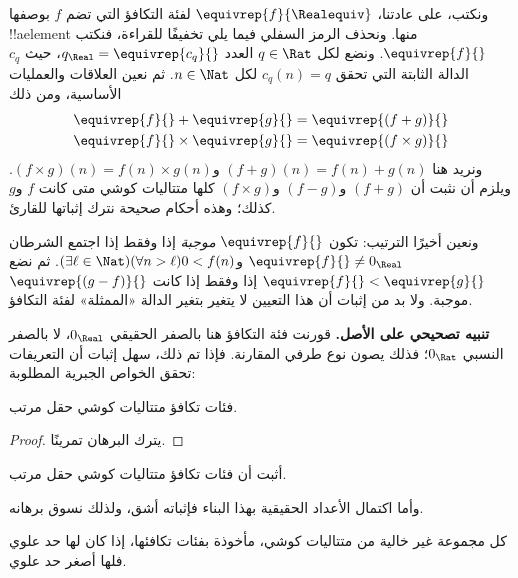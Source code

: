 \documentclass[../../../include/open-logic-section]{subfiles}
\begin{document}
ونكتب، على عادتنا، $\equivrep{f}{\Realequiv}$ لفئة التكافؤ التي تضم $f$ بوصفها !!a{element} منها. ونحذف الرمز السفلي فيما يلي تخفيفًا للقراءة، فنكتب $\equivrep{f}{}$. ونضع لكل $q \in \Rat$ العدد $q_{\Real} = \equivrep{c_{q}}{}$، حيث $c_{q}$ الدالة الثابتة التي تحقق $c_q(n) = q$ لكل $n \in \Nat$. ثم نعين العلاقات والعمليات الأساسية، ومن ذلك
\begin{align*}
	\equivrep{f}{} + \equivrep{g}{} &= 	\equivrep{(f + g)}{} \\
	\equivrep{f}{} \times 	\equivrep{g}{} &= \equivrep{(f \times g)}{} 
\end{align*}
ونريد هنا $(f + g)(n) = f(n) + g(n)$ و$(f \times g)(n) = f(n) \times
g(n)$. ويلزم أن نثبت أن $(f + g)$ و$(f-g)$ و$(f\times g)$ كلها متتاليات كوشي متى كانت $f$ و$g$ كذلك؛ وهذه أحكام صحيحة نترك إثباتها للقارئ.

ونعين أخيرًا الترتيب: تكون $\equivrep{f}{}$ \emph{موجبة} إذا وفقط إذا اجتمع الشرطان $\equivrep{f}{}\neq 0_\Real$ و$(\exists \ell \in \Nat)(\forall n > \ell)0 < f(n)$. ثم نضع $\equivrep{f}{} < \equivrep{g}{}$ إذا وفقط إذا كانت $\equivrep{(g - f)}{}$ موجبة. ولا بد من إثبات أن هذا التعيين لا يتغير بتغير الدالة «الممثلة» لفئة التكافؤ.

\textbf{تنبيه تصحيحي على الأصل.} قورنت فئة التكافؤ هنا بالصفر الحقيقي
$0_\Real$، لا بالصفر النسبي $0_\Rat$؛ فذلك يصون نوع طرفي المقارنة.
فإذا تم ذلك، سهل إثبات أن التعريفات تحقق الخواص الجبرية المطلوبة:
\begin{thm}
فئات تكافؤ متتاليات كوشي حقل مرتب.
\end{thm}

\begin{proof}
يترك البرهان تمرينًا.
\end{proof}

\begin{prob}
أثبت أن فئات تكافؤ متتاليات كوشي حقل مرتب.
\end{prob}

وأما اكتمال الأعداد الحقيقية بهذا البناء فإثباته أشق، ولذلك نسوق برهانه.

\begin{thm}
كل مجموعة غير خالية من متتاليات كوشي، مأخوذة بفئات تكافئها، إذا كان لها حد علوي فلها أصغر حد علوي.
\end{thm}
\end{document}
